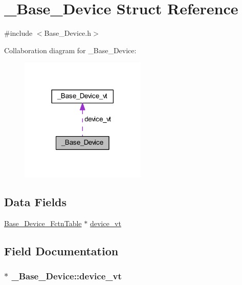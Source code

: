 \hypertarget{struct___base___device}{\section{\-\_\-\-Base\-\_\-\-Device Struct Reference}
\label{struct___base___device}
}


{\ttfamily \#include $<$Base\-\_\-\-Device.\-h$>$}



Collaboration diagram for \-\_\-\-Base\-\_\-\-Device\-:
\nopagebreak
\begin{figure}[H]
\begin{center}
\leavevmode
\includegraphics[width=170pt]{struct___base___device__coll__graph}
\end{center}
\end{figure}
\subsection*{Data Fields}
\begin{DoxyCompactItemize}
\item 
\hyperlink{_base___device_8h_aa8999bea473856e93a1892271b2a7d6f}{Base\-\_\-\-Device\-\_\-\-Fctn\-Table} $\ast$ \hyperlink{struct___base___device_a1a2690f94f12adfafbe276f14ffede62}{device\-\_\-vt}
\end{DoxyCompactItemize}


\subsection{Field Documentation}
\hypertarget{struct___base___device_a1a2690f94f12adfafbe276f14ffede62}{
\subsubsection[{device\-\_\-vt}]{$\ast$ \-\_\-\-Base\-\_\-\-Device\-::device\-\_\-vt}}\label{struct___base___device_a1a2690f94f12adfafbe276f14ffede62}


